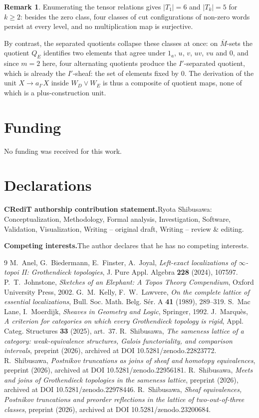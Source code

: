 \documentclass[11pt]{amsart}
\theoremstyle{definition}
\newtheorem{rem}[thm]{Remark}
\begin{document}
\begin{rem}
Enumerating the tensor relations gives $|T_1|=6$ and $|T_k|=5$ for $k\ge2$:
besides the zero class, four classes of cut configurations of non-zero words
persist at every level, and no multiplication map is surjective.
\end{rem}

By contrast, the separated quotients collapse these classes at once: on
$\overline M$-sets the quotient $Q_E$ identifies two elements that agree
under $1_a$, $u$, $v$, $uv$, $vu$ and $0$, and since $m=2$ here, four
alternating quotients produce the $I'$-separated quotient, which is already the
$I'$-sheaf: the set of elements fixed by $0$. The derivation of the unit
$X\to a_{I'}X$ inside $W_D\vee W_E$ is thus a composite of quotient maps,
none of which is a plus-construction unit.

\section*{Funding}
No funding was received for this work.

\section*{Declarations}
\noindent\textbf{CRediT authorship contribution statement.}\quad Ryota Shibusawa:
Conceptualization, Methodology, Formal analysis, Investigation, Software,
Validation, Visualization, Writing -- original draft, Writing -- review \& editing.

\noindent\textbf{Competing interests.}\quad The author declares that he has no
competing interests.

\begin{thebibliography}{9}
 M.~Anel, G.~Biedermann, E.~Finster, A.~Joyal, \emph{Left-exact
localizations of $\infty$-topoi II: Grothendieck topologies}, J. Pure Appl.
Algebra \textbf{228} (2024), 107597.
 P.~T.~Johnstone, \emph{Sketches of an Elephant: A Topos
Theory Compendium}, Oxford University Press, 2002.
 G.~M.~Kelly, F.~W.~Lawvere, \emph{On the complete lattice of
essential localizations}, Bull. Soc. Math. Belg. S\'er. A \textbf{41} (1989),
289--319.
 S.~Mac Lane, I.~Moerdijk, \emph{Sheaves in Geometry and Logic},
Springer, 1992.
 J.~Marqu\`es, \emph{A criterion for categories on which
every Grothendieck topology is rigid}, Appl. Categ. Structures \textbf{33}
(2025), art.\ 37.
 R.~Shibusawa, \emph{The sameness lattice of a category:
weak-equivalence structures, Galois functoriality, and comparison intervals},
preprint (2026), archived at DOI 10.5281/zenodo.22823772.
 R.~Shibusawa, \emph{Postnikov truncations as joins of sheaf
and homotopy equivalences}, preprint (2026), archived at DOI 10.5281/zenodo.22956181.
 R.~Shibusawa, \emph{Meets and joins of Grothendieck
topologies in the sameness lattice}, preprint (2026), archived at DOI
10.5281/zenodo.22978446.
 R.~Shibusawa, \emph{Sheaf equivalences, Postnikov
truncations and preorder reflections in the lattice of two-out-of-three
classes}, preprint (2026), archived at DOI 10.5281/zenodo.23200684.
\end{thebibliography}
\end{document}
